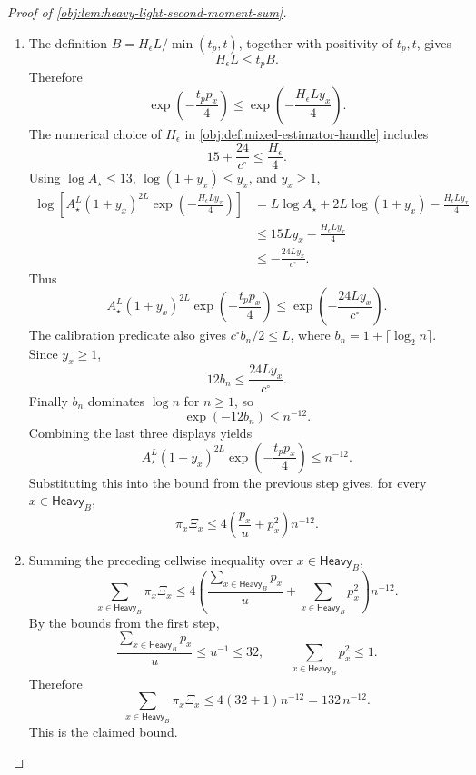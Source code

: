 \begin{proof}[Proof of \cref{obj:lem:heavy-light-second-moment-sum}]
\begin{enumerate}
\item The definition \(B=H_\epsilon L/\min(t_p,t)\), together with positivity of \(t_p,t\), gives
\[
H_\epsilon L\le t_pB.
\]
Therefore
\[
\exp\!\left(-\frac{t_pp_x}{4}\right)
\le
\exp\!\left(-\frac{H_\epsilon L y_x}{4}\right).
\]
The numerical choice of \(H_\epsilon\) in \cref{obj:def:mixed-estimator-handle} includes
\[
15+\frac{24}{c^\circ}\le \frac{H_\epsilon}{4}.
\]
Using \(\log A_\star\le13\), \(\log(1+y_x)\le y_x\), and \(y_x\ge1\),
\[
\begin{aligned}
\log\!\left[
A_\star^L(1+y_x)^{2L}
\exp\!\left(-\frac{H_\epsilon L y_x}{4}\right)
\right]
&=
L\log A_\star+2L\log(1+y_x)-\frac{H_\epsilon L y_x}{4} \\
&\le
15Ly_x-\frac{H_\epsilon L y_x}{4} \\
&\le
-\frac{24Ly_x}{c^\circ}.
\end{aligned}
\]
Thus
\[
A_\star^L(1+y_x)^{2L}
\exp\!\left(-\frac{t_pp_x}{4}\right)
\le
\exp\!\left(-\frac{24Ly_x}{c^\circ}\right).
\]
The calibration predicate also gives \(c^\circ b_n/2\le L\), where \(b_n=1+\lceil\log_2 n\rceil\). Since \(y_x\ge1\),
\[
12b_n\le \frac{24Ly_x}{c^\circ}.
\]
Finally \(b_n\) dominates \(\log n\) for \(n\ge1\), so
\[
\exp(-12b_n)\le n^{-12}.
\]
Combining the last three displays yields
\[
A_\star^L(1+y_x)^{2L}
\exp\!\left(-\frac{t_pp_x}{4}\right)
\le n^{-12}.
\]
Substituting this into the bound from the previous step gives, for every \(x\in\mathsf{Heavy}_B\),
\[
\pi_x\Xi_x
\le
4\left(\frac{p_x}{u}+p_x^2\right)n^{-12}.
\] %

\item Summing the preceding cellwise inequality over \(x\in\mathsf{Heavy}_B\),
\[
\sum_{x\in\mathsf{Heavy}_B}\pi_x\Xi_x
\le
4\left(
\frac{\sum_{x\in\mathsf{Heavy}_B}p_x}{u}
+
\sum_{x\in\mathsf{Heavy}_B}p_x^2
\right)n^{-12}.
\]
By the bounds from the first step,
\[
\frac{\sum_{x\in\mathsf{Heavy}_B}p_x}{u}
\le
u^{-1}
\le32,
\qquad
\sum_{x\in\mathsf{Heavy}_B}p_x^2\le1.
\]
Therefore
\[
\sum_{x\in\mathsf{Heavy}_B}\pi_x\Xi_x
\le
4(32+1)n^{-12}
=
132\,n^{-12}.
\]
This is the claimed bound. %
\end{enumerate}
\end{proof}
